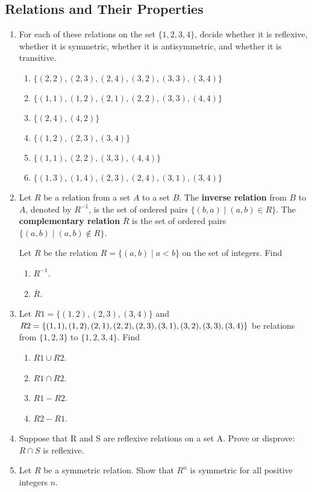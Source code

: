 \documentclass{sig-alternate-05-2015}
\begin{document}
\subsection{Relations and Their Properties}
\begin{enumerate}
\item For each of these relations on the set $\{1, 2, 3, 4\}$, decide
whether it is reflexive, whether it is symmetric, whether
it is antisymmetric, and whether it is transitive.
\begin{enumerate}
\item $\{(2, 2), (2, 3), (2, 4), (3, 2), (3, 3), (3, 4)\}$
\item $\{(1, 1), (1, 2), (2, 1), (2, 2), (3, 3), (4, 4)\}$
\item $\{(2, 4), (4, 2)\}$
\item $\{(1, 2), (2, 3), (3, 4)\}$
\item $\{(1, 1), (2, 2), (3, 3), (4, 4)\}$
\item $\{(1, 3), (1, 4), (2, 3), (2, 4), (3, 1), (3, 4)\}$
\end{enumerate}
\item 
Let $R$ be a relation from a set $A$ to a set $B$. The \textbf{inverse relation}
from $B$ to $A$, denoted by $R^{−1}$, is the set of ordered pairs
$\{(b, a) \mid (a, b) \in R\}$. The \textbf{complementary relation} $\overline{R}$ is the
set of ordered pairs $\{(a, b) \mid (a, b) \notin R\}$.

Let $R$ be the relation $R = \{(a, b) \mid a < b\}$ on the set of
integers. Find
\begin{enumerate}
	\item $R^{-1}$.
	\item $\overline{R}$.
\end{enumerate}
\item Let $R1 = \{(1, 2), (2, 3), (3, 4)\}$ and $R2 = \{(1, 1), (1, 2),\\
(2, 1), (2, 2), (2, 3), (3, 1), (3, 2), (3, 3), (3, 4)\}$ be relations
from $\{1, 2, 3\}$ to $\{1, 2, 3, 4\}$. Find
\begin{enumerate}
\item $R1\cup R2$. 
\item $R1 \cap R2$.
\item $R1-R2$. 
\item $R2-R1$.
\end{enumerate}
\item Suppose that R and S are reflexive relations on a set A.
Prove or disprove: $R \cap S$ is reflexive.
\item Let $R$ be a symmetric relation. Show that $R^n$ is symmetric for all positive integers $n$.

\end{enumerate}
\end{document}
